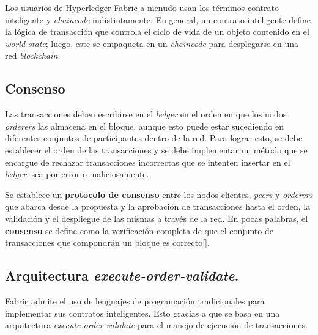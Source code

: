 Los usuarios de Hyperledger Fabric a menudo usan los términos contrato inteligente y \textit{chaincode} indistintamente. En general, un contrato inteligente define la lógica de transacción que controla el ciclo de vida de un objeto contenido en el \textit{world state}; luego, este se empaqueta en un \textit{chaincode} para desplegarse en una red \textit{blockchain}.

\subsection{Consenso}
Las transacciones deben escribirse en el \textit{ledger} en el orden en que los nodos \textit{orderers} las almacena en el bloque, aunque esto puede estar sucediendo en diferentes conjuntos de participantes dentro de la red. Para lograr esto, se debe establecer el orden de las transacciones y se debe implementar un método que se encargue de rechazar transacciones incorrectas que se intenten insertar en el\textit{ ledger}, sea por error o maliciosamente.

Se establece un  \textbf{protocolo de consenso} entre los nodos clientes,  \textit{peers} y \textit{orderers} que abarca desde la propuesta y la aprobación de transacciones hasta el orden, la validación y el despliegue de las mismas a través de la red. En pocas palabras, el \textbf{consenso} se define como la verificación completa de que el conjunto de transacciones que compondrán un bloque es correcto[\cite{hlf-doc}].



\subsection{Arquitectura \textit{execute-order-validate}.}

Fabric admite el uso de lenguajes de programación tradicionales para implementar sus contratos inteligentes. Esto gracias a que se basa en una arquitectura \textit{execute-order-validate} para el manejo de ejecución de transacciones.

